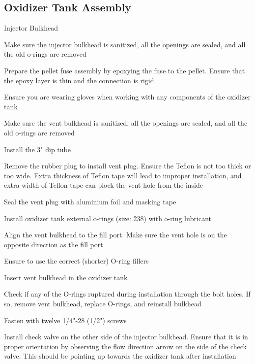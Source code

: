     \subsection{Oxidizer Tank Assembly}
    \begin{checklist} %
        \item Injector Bulkhead
        \begin{checklist} %
            \item Make sure the injector bulkhead is sanitized, all the openings are sealed, and all the old o-rings are removed
            \item Prepare the pellet fuse assembly by epoxying the fuse to the pellet. Ensure that the epoxy layer is thin and the connection is rigid
            \item Ensure you are wearing gloves when working with any components of the oxidizer tank
            \item Make sure the vent bulkhead is sanitized, all the openings are sealed, and all the old o-rings are removed
            \item Install the 3" dip tube
            \item Remove the rubber plug to install vent plug. Ensure the Teflon is not too thick or too wide. Extra thickness of Teflon tape will lead to improper installation, and extra width of Teflon tape can block the vent hole from the inside
            \item Seal the vent plug with aluminium foil and masking tape
            \item Install oxidizer tank external o-rings (size: 238) with o-ring lubricant
            \item Align the vent bulkhead to the fill port. Make sure the vent hole is on the opposite direction as the fill port
            \item Ensure to use the correct (shorter) O-ring fillers
            \item Insert vent bulkhead in the oxidizer tank
            \item Check if any of the O-rings ruptured during installation through the bolt holes. If so, remove vent bulkhead, replace O-rings, and reinstall bulkhead
            \item Fasten with twelve 1/4"-28 (1/2") screws
            \item Install check valve on the other side of the injector bulkhead. Ensure that it is in proper orientation by observing the flow direction arrow on the side of the check valve. This should be pointing up towards the oxidizer tank after installation

\end{checklist}
\end{checklist}
